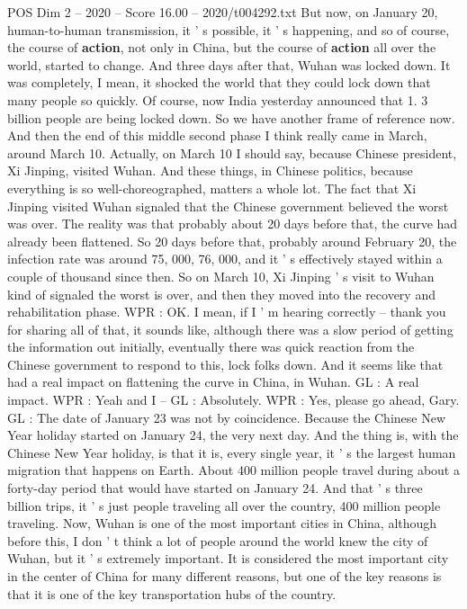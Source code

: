 \begin{textsample}{POS Dim 2 – 2020 – Score 16.00 – 2020/t004292.txt}
But now, on January 20, human-to-human transmission, it ' s possible, it ' s happening, and so of course, the course of \textbf{action}, not only in China, but the course of \textbf{action} all over the world, started to change.
And three days after that, Wuhan was locked down.
It was completely, I mean, it shocked the world that they could lock down that many people so quickly.
Of course, now India yesterday announced that 1. 3 billion people are being locked down.
So we have another frame of reference now.
And then the end of this middle second phase I think really came in March, around March 10.
Actually, on March 10 I should say, because Chinese president, Xi Jinping, visited Wuhan.
And these things, in Chinese politics, because everything is so well-choreographed, matters a whole lot.
The fact that Xi Jinping visited Wuhan signaled that the Chinese government believed the worst was over.
The reality was that probably about 20 days before that, the curve had already been flattened.
So 20 days before that, probably around February 20, the infection rate was around 75, 000, 76, 000, and it ' s effectively stayed within a couple of thousand since then.
So on March 10, Xi Jinping ' s visit to Wuhan kind of signaled the worst is over, and then they moved into the recovery and rehabilitation phase.
WPR : OK.
I mean, if I ' m hearing correctly -- thank you for sharing all of that, it sounds like, although there was a slow period of getting the information out initially, eventually there was quick reaction from the Chinese government to respond to this, lock folks down.
And it seems like that had a real impact on flattening the curve in China, in Wuhan.
GL : A real impact.
WPR : Yeah and I -- GL : Absolutely.
WPR : Yes, please go ahead, Gary.
GL : The date of January 23 was not by coincidence.
Because the Chinese New Year holiday started on January 24, the very next day.
And the thing is, with the Chinese New Year holiday, is that it is, every single year, it ' s the largest human migration that happens on Earth.
About 400 million people travel during about a forty-day period that would have started on January 24.
And that ' s three billion trips, it ' s just people traveling all over the country, 400 million people traveling.
Now, Wuhan is one of the most important cities in China, although before this, I don ' t think a lot of people around the world knew the city of Wuhan, but it ' s extremely important.
It is considered the most important city in the center of China for many different reasons, but one of the key reasons is that it is one of the key transportation hubs of the country.

\end{textsample}
